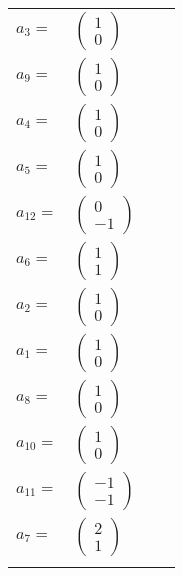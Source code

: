 \documentclass[1p]{elsarticle_modified}
\theoremstyle{definition}
\begin{document}
\begin{tabular}{m{7pt} m{180pt} m{7pt} m{180pt} }
\flushright $a_{3}=$&$\begin{pmatrix}1\\0\end{pmatrix}$ \\
\flushright $a_{9}=$&$\begin{pmatrix}1\\0\end{pmatrix}$ \\
\flushright $a_{4}=$&$\begin{pmatrix}1\\0\end{pmatrix}$ \\
\flushright $a_{5}=$&$\begin{pmatrix}1\\0\end{pmatrix}$ \\
\flushright $a_{12}=$&$\begin{pmatrix}0\\-1\end{pmatrix}$ \\
\flushright $a_{6}=$&$\begin{pmatrix}1\\1\end{pmatrix}$ \\
\flushright $a_{2}=$&$\begin{pmatrix}1\\0\end{pmatrix}$ \\
\flushright $a_{1}=$&$\begin{pmatrix}1\\0\end{pmatrix}$ \\
\flushright $a_{8}=$&$\begin{pmatrix}1\\0\end{pmatrix}$ \\
\flushright $a_{10}=$&$\begin{pmatrix}1\\0\end{pmatrix}$ \\
\flushright $a_{11}=$&$\begin{pmatrix}-1\\-1\end{pmatrix}$ \\
\flushright $a_{7}=$&$\begin{pmatrix}2\\1\end{pmatrix}$\\&\end{tabular}
\end{document}
